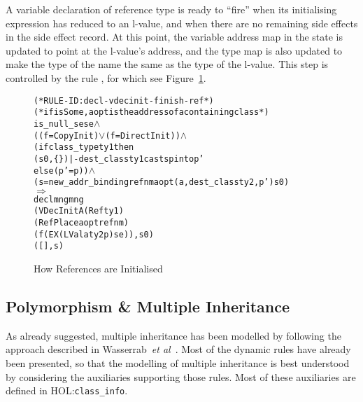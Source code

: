 \documentclass[11pt]{article}
\newcommand{\lbr}{\texttt{\{}}
\newcommand{\rbr}{\texttt{\}}}
\newcommand{\HOLfile}[1]{HOL:\texttt{#1}}
\begin{document}
A variable declaration of reference type is ready to ``fire'' when its
initialising expression has reduced to an l-value, and when there are
no remaining side effects in the side effect record.  At this point,
the variable address map in the state is updated to point at the
l-value's address, and the type map is also updated to make the type
of the name the same as the type of the l-value.
This step is controlled by the rule ,
for which see Figure~\ref{fig:decl-vdecinit-finish-ref}.
\begin{figure}[hbtp]
\begin{center}
  \begin{minipage}{\textwidth}
%
\begin{alltt}
(* RULE-ID: decl-vdecinit-finish-ref *)
(* if isSome, aopt is the address of a containing class *)
     is_null_se se \(\land\)
     ((f = CopyInit) \(\lor\) (f = DirectInit)) \(\land\)
     (if class_type ty1 then
        (s0,\lbr\rbr) |- dest_class ty1 casts p into p'
      else (p' = p)) \(\land\)
     (s = new_addr_binding refnm aopt (a,dest_class ty2,p') s0)
   \(\Rightarrow\)
     declmng mng
             (VDecInitA (Ref ty1)
                        (RefPlace aopt refnm)
                        (f (EX (LVal a ty2 p) se)), s0)
             ([], s)
\end{alltt}
  \end{minipage}
\end{center}
\caption{How References are Initialised}
\label{fig:decl-vdecinit-finish-ref}
\end{figure}




\subsection{Polymorphism \& Multiple Inheritance}
\label{sec:multiple-inheritance}

As already suggested, multiple inheritance has been modelled by
following the approach described in Wasserrab~\emph{et
  al}~\cite{wasserrab-nst-OOPSLA06}.  Most of the dynamic rules have
already been presented, so that the modelling of multiple inheritance
is best understood by considering the auxiliaries supporting those
rules.  Most of these auxiliaries are defined in
\HOLfile{class_info}.

\newcommand{\fld}{\texttt{fld}}
\newcommand{\Cs}{\texttt{Cs}}
\end{document}
